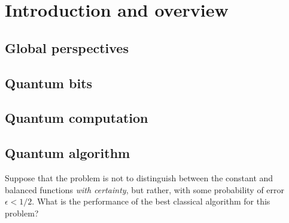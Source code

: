 \documentclass[en]{sol-man}
\begin{document}
\fi
\chapter{Introduction and overview}
\section{Global perspectives}
\section{Quantum bits}
\section{Quantum computation}
\section{Quantum algorithm}
\begin{exe}
    Suppose that the problem is not to distinguish between the constant and balanced functions \emph{with certainty}, but rather, with some probability of error $\epsilon<1/2$. What is the performance of the best classical algorithm for this problem?
\end{exe}
\begin{sol}
    
\end{sol}
\ifx\allfiles\undefined
\end{document}
